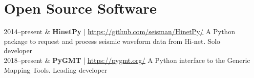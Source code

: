 \section{Open Source Software}

\begin{EntriesTable}{0.18}{0.02}{0.8}
2014--present & \textbf{HinetPy} | \url{https://github.com/seisman/HinetPy/} \newline
                A Python package to request and process seismic waveform data from Hi-net. \newline
                Solo developer \\
2018--present & \textbf{PyGMT} | \url{https://pygmt.org/} \newline
                A Python interface to the Generic Mapping Tools. \newline
                Leading developer \\
\end{EntriesTable}
